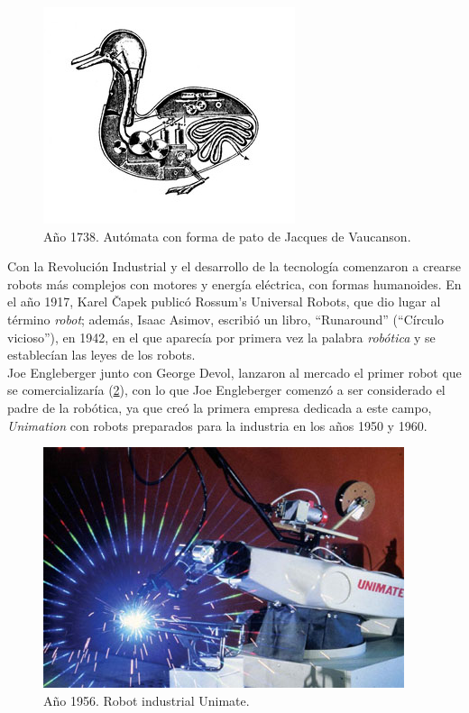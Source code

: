 \begin{figure}[H]
	\centering %
	\includegraphics[scale=0.8]{imagenes/digestingduck.jpg}
	\caption{Año 1738. Autómata con forma de pato de Jacques de Vaucanson.} \label{fig:duck}
\end{figure}

\noindent Con la Revolución Industrial y el desarrollo de la tecnología comenzaron a crearse robots más complejos con motores y energía eléctrica, con formas humanoides. En el año 1917, Karel Čapek publicó Rossum's Universal Robots, que dio lugar al término \textit{robot}; además, Isaac Asimov, escribió un libro, ``Runaround'' (``Círculo vicioso''), en 1942, en el que aparecía por primera vez la palabra \textit{robótica} y se establecían las leyes de los robots. \\

\noindent Joe Engleberger junto con George Devol, lanzaron al mercado el primer robot que se comercializaría (\ref{fig:unim}), con lo que Joe Engleberger comenzó a ser considerado el padre de la robótica, ya que creó la primera empresa dedicada a este campo, \textit{Unimation} con robots preparados para la industria en los años 1950 y 1960. \\

\begin{figure}[!h]
	\centering %
	\includegraphics[scale=0.5]{imagenes/unimate.jpg}
	\caption{Año 1956. Robot industrial Unimate.} \label{fig:unim}
\end{figure}

